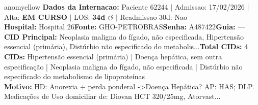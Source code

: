 \documentclass[a4paper,10pt]{article}
\begin{document}
\begin{anomalycard}[Internacao 165786 | GHO-PETROBRAS | MODERADO (z=2.42)]{anomyellow}
\textbf{Dados da Internacao:} Paciente 62244 $\mid$ Admissao: 17/02/2026 $\mid$ Alta: \textcolor{anomorange}{\textbf{EM CURSO}} $\mid$ LOS: \textbf{34d \textcolor{anomorange}{$\circlearrowleft$}} $\mid$ Readmissao 30d: Nao\\
\textbf{Hospital:} Hospital 26\quad\textbf{Fonte:} GHO-PETROBRAS\quad\textbf{Senha:} A487422\quad\textbf{Guia:} ---\\
\textbf{CID Principal:} {\small Neoplasia maligna do fígado, não especificada, Hipertensão essencial (primária), Distúrbio não especificado do metabolis...}\quad\textbf{Total CIDs:} 4\\

\textbf{CIDs:} {\scriptsize Hipertensão essencial (primária) | Doença hepática, sem outra especificação | Neoplasia maligna do fígado, não especificada | Distúrbio não especificado do metabolismo de lipoproteínas}\\

\textbf{Motivo:} {\scriptsize HD: Anorexia + perda ponderal ->Doença Hepática?  AP:  HAS; DLP.  Medicações de Uso domiciliar de: Diovan HCT 320/25mg, Atorvast...}\\


\end{anomalycard}
\end{document}

